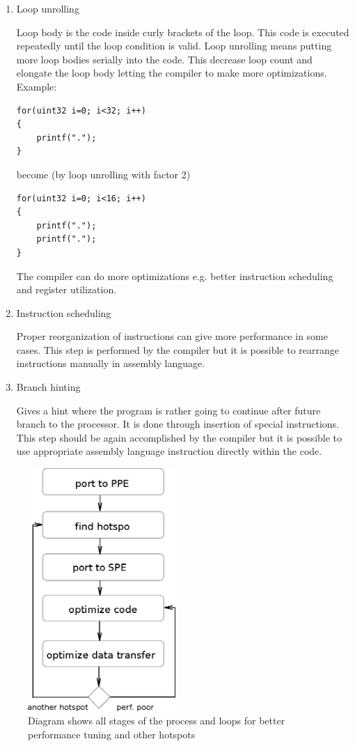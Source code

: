 \begin{enumerate}
\item{Loop unrolling}
\par
Loop body is the code inside curly brackets of the loop.
This code is executed repeatedly until the loop condition is valid.
Loop unrolling means putting more loop bodies serially into the code.
This decrease loop count and elongate the loop body letting the compiler to make more optimizations.
Example:
\begin{verbatim}
for(uint32 i=0; i<32; i++)
{
    printf(".");
}
\end{verbatim}
become (by loop unrolling with factor 2)
\begin{verbatim}
for(uint32 i=0; i<16; i++)
{
    printf(".");
    printf(".");
}
\end{verbatim}
The compiler can do more optimizations e.g. better instruction scheduling and register utilization.

\item{Instruction scheduling}
\par
Proper reorganization of instructions can give more performance in some cases.
This step is performed by the compiler but it is possible to rearrange instructions manually in assembly language.

\item{Branch hinting}
\par
Gives a hint where the program is rather going to continue after future branch to the processor.
It is done through insertion of special instructions.
This step should be again accomplished by the compiler but it is possible to use appropriate assembly language instruction directly within the code.
\end{enumerate}

\begin{figure}
    \centering
    \includegraphics[width=0.5\textwidth]{data/portingCycle}
    \caption[Application porting cycle]{Diagram shows all stages of the process and loops for better performance tuning and other hotspots}
    \label{fg:appPorting}
\end{figure}

